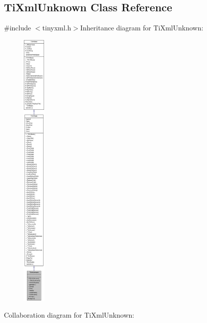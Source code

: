 \hypertarget{class_ti_xml_unknown}{
\subsection{TiXmlUnknown Class Reference}
\label{class_ti_xml_unknown}
}


{\ttfamily \#include $<$tinyxml.h$>$}Inheritance diagram for TiXmlUnknown:\nopagebreak
\begin{figure}[H]
\begin{center}
\leavevmode
\includegraphics[height=400pt]{class_ti_xml_unknown__inherit__graph}
\end{center}
\end{figure}
Collaboration diagram for TiXmlUnknown:\nopagebreak
